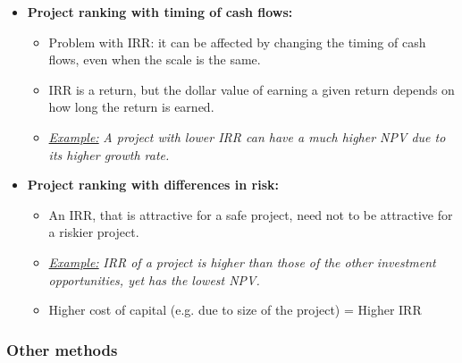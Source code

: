 \documentclass[ieeetran]{article}
\begin{document}
\begin{itemize}
\item \textbf{Project ranking with timing of cash flows:}
	\begin{itemize}
	\item Problem with IRR: it can be affected by changing the timing of cash flows, even when the scale is the same.
	\item IRR is a return, but the dollar value of earning a given return depends on how long the return is earned.
	\item \underline{\textit{Example:}} \textit{A project with lower IRR can have a much higher NPV due to its higher growth rate.}
	\end{itemize}

\item \textbf{Project ranking with differences in risk:}
	\begin{itemize}
	  \item An IRR, that is attractive for a safe project, need not to be attractive for a riskier project.
	\item \underline{\textit{Example:}} \textit{IRR of a project is higher than those of the other investment opportunities, yet has the lowest NPV.}
	\item Higher cost of capital (e.g. due to size of the project) = Higher IRR
	\end{itemize}

\end{itemize}

\subsubsection{Other methods} %
\label{ssub:other_methods}
\end{document}
